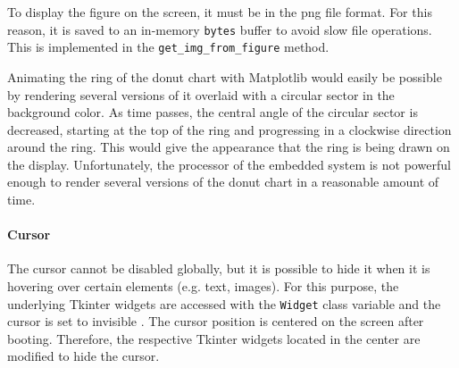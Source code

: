 To display the figure on the screen, it must be in the \acrshort{png} file format.
For this reason, it is saved to an in-memory \texttt{bytes} buffer to avoid slow file operations.
This is implemented in the \texttt{get\_img\_from\_figure} method.

Animating the ring of the donut chart with Matplotlib would easily be possible by rendering several versions of it overlaid with a circular sector in the background color.
As time passes, the central angle of the circular sector is decreased, starting at the top of the ring and progressing in a clockwise direction around the ring.
This would give the appearance that the ring is being drawn on the display.
Unfortunately, the processor of the embedded system is not powerful enough to render several versions of the donut chart in a reasonable amount of time.

\paragraph{Cursor}
The cursor cannot be disabled globally, but it is possible to hide it when it is hovering over certain elements (e.g. text, images).
For this purpose, the underlying Tkinter widgets are accessed with the \texttt{Widget} class variable and the cursor is set to invisible \cite{inf_pysimplegui_widget}.
The cursor position is centered on the screen after booting.
Therefore, the respective Tkinter widgets located in the center are modified to hide the cursor.

